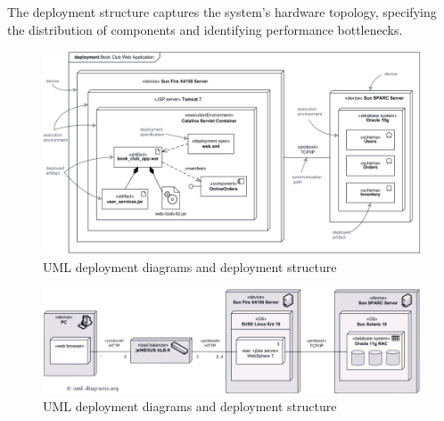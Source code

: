 \documentclass[12pt, a4paper]{report}
\begin{document}
\begin{itemize}
                The deployment structure captures the system's hardware topology, specifying the distribution of components and identifying performance bottlenecks.
                \begin{figure}[H]
                    \centering
                    \includegraphics[width=0.5\linewidth]{images/allocation1.png}
                    \caption{UML deployment diagrams and deployment structure}
                \end{figure}
                \begin{figure}[H]
                    \centering
                    \includegraphics[width=0.5\linewidth]{images/allocation2.png}
                    \caption{UML deployment diagrams and deployment structure}
                \end{figure}
        \end{itemize}
\end{document}

